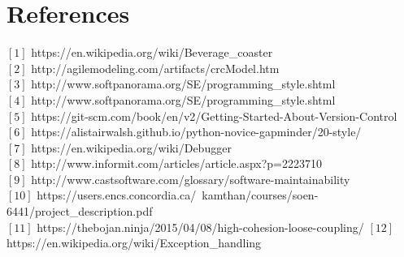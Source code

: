 \documentclass[11pt]{article}
\begin{document}
\section{References}
	
		$[1]$ https://en.wikipedia.org/wiki/Beverage\_coaster \\
		$[2]$ http://agilemodeling.com/artifacts/crcModel.htm \\
		$[3]$ http://www.softpanorama.org/SE/programming\_style.shtml \\
		$[4]$ http://www.softpanorama.org/SE/programming\_style.shtml \\
		$[5]$ https://git-scm.com/book/en/v2/Getting-Started-About-Version-Control \\
		$[6]$ https://alistairwalsh.github.io/python-novice-gapminder/20-style/ \\
		$[7]$ https://en.wikipedia.org/wiki/Debugger\\
		$[8]$ http://www.informit.com/articles/article.aspx?p=2223710\\
		$[9]$ http://www.castsoftware.com/glossary/software-maintainability\\
		$[10]$ https://users.encs.concordia.ca/~kamthan/courses/soen-6441/project\_description.pdf\\
		$[11]$ https://thebojan.ninja/2015/04/08/high-cohesion-loose-coupling/
		$[12]$ https://en.wikipedia.org/wiki/Exception\_handling
\end{document}
